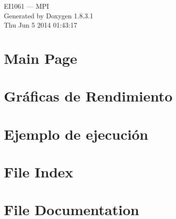 \documentclass{book}
\begin{document}
\hypersetup{pageanchor=false,citecolor=blue}
\begin{titlepage}
\vspace*{7cm}
\begin{center}
{\Large E\-I1061 --- M\-P\-I }\\
\vspace*{1cm}
{\large Generated by Doxygen 1.8.3.1}\\
\vspace*{0.5cm}
{\small Thu Jun 5 2014 01:43:17}\\
\end{center}
\end{titlepage}
\clearemptydoublepage
{}
\tableofcontents
\clearemptydoublepage
{}
\hypersetup{pageanchor=true,citecolor=blue}
\chapter{Main Page}
\label{index}\hypertarget{index}{}
\chapter{Gráficas de Rendimiento}
\label{md_performance}
\hypertarget{md_performance}{}

\chapter{Ejemplo de ejecución}
\label{md_usage}
\hypertarget{md_usage}{}

\chapter{File Index}

\chapter{File Documentation}









\printindex
\end{document}
